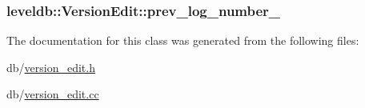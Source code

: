 \subsubsection[{prev\+\_\+log\+\_\+number\+\_\+}]{ leveldb\+::\+Version\+Edit\+::prev\+\_\+log\+\_\+number\+\_\+\hspace{0.3cm}{\ttfamily [private]}}\label{classleveldb_1_1_version_edit_ac8762934b27315cb0ba897c306412562}


The documentation for this class was generated from the following files\+:\begin{DoxyCompactItemize}
\item 
db/\hyperlink{version__edit_8h}{version\+\_\+edit.\+h}\item 
db/\hyperlink{version__edit_8cc}{version\+\_\+edit.\+cc}\end{DoxyCompactItemize}
